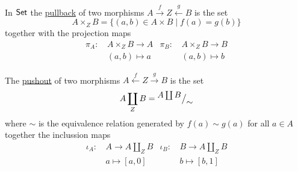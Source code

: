 \documentclass[../../main]{subfiles}
\begin{document}
\begin{example}\label{ex:pullback-Set}
  In \(\mathsf{Set}\) the \hyperref[def:pullback]{pullback} of two morphisms \(A \xrightarrow{f} Z \xleftarrow{g} B\) is the set
  \begin{equation*}
    A \times_{Z} B = \{ (a, b) \in A \times B \mid f(a) = g(b)\}
  \end{equation*}
  together with the projection maps
  \begin{align*}
    \pi_{A}:\,& A \times_{Z} B \to A  & \pi_{B}:\,& A \times_{Z} B \to B \\
            & (a, b) \mapsto a & & (a, b) \mapsto b
  \end{align*}

  The \hyperref[def:pushout]{pushout} of two morphisms \(A \xleftarrow{f} Z \xrightarrow{g} B\) is the set
  \begin{equation*}
    A \coprod_{Z} B = {^{\textstyle A \coprod B}\big/_{\textstyle \sim}}
  \end{equation*}
  where \(\sim\) is the equivalence relation generated by \(f(a) \sim g(a)\) for all \(a \in A\) together the inclussion maps
  \begin{align*}
    \iota_{A}:\,& A \to A \coprod_{Z} B  & \iota_{B}:\,& B \to  A \coprod_{Z} B \\
            & a \mapsto [a, 0] & & b \mapsto [b, 1]
  \end{align*}

\end{example}
\end{document}

